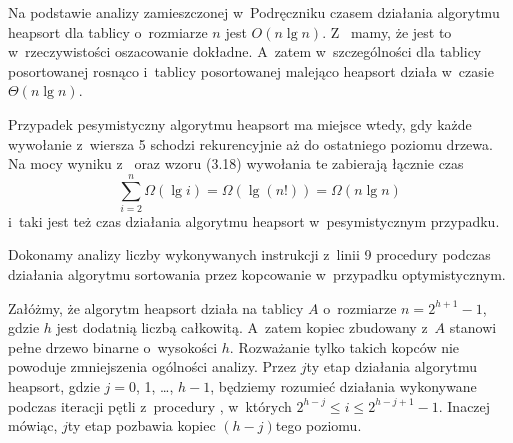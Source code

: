 \exercise %
Na podstawie analizy zamieszczonej w~Podręczniku czasem działania algorytmu heapsort dla tablicy o~rozmiarze $n$ jest $O(n\lg n)$.
Z~ mamy, że jest to w~rzeczywistości oszacowanie dokładne.
A~zatem w~szczególności dla tablicy posortowanej rosnąco i~tablicy posortowanej malejąco heapsort działa w~czasie $\Theta(n\lg n)$.

\exercise %
Przypadek pesymistyczny algorytmu heapsort ma miejsce wtedy, gdy każde wywołanie  z~wiersza 5 schodzi rekurencyjnie aż do ostatniego poziomu drzewa.
Na mocy wyniku z~ oraz wzoru (3.18) wywołania te zabierają łącznie czas
\[
	\sum_{i=2}^n\Omega(\lg i) = \Omega(\lg(n!)) = \Omega(n\lg n)
\]
i~taki jest też czas działania algorytmu heapsort w~pesymistycznym przypadku.

\exercise %
Dokonamy analizy liczby wykonywanych instrukcji z~linii 9 procedury  podczas działania algorytmu sortowania przez kopcowanie w~przypadku optymistycznym.

Załóżmy, że algorytm heapsort działa na tablicy $A$ o~rozmiarze $n=2^{h+1}-1$, gdzie $h$ jest dodatnią liczbą całkowitą.
A~zatem kopiec zbudowany z~$A$ stanowi pełne drzewo binarne o~wysokości $h$.
Rozważanie tylko takich kopców nie powoduje zmniejszenia ogólności analizy.
Przez $j$\nbhyphen ty etap działania algorytmu heapsort, gdzie $j=0$, 1, \dots, $h-1$, będziemy rozumieć działania wykonywane podczas iteracji pętli  z~procedury , w~których $2^{h-j}\le i\le2^{h-j+1}-1$.
Inaczej mówiąc, $j$\nbhyphen ty etap pozbawia kopiec $(h-j)$\nbhyphen tego poziomu.

